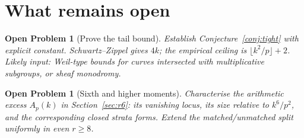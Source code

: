 \documentclass[11pt]{article}
\newtheorem{openproblem}[theorem]{Open Problem}
\begin{document}
\section{What remains open}\label{sec:open}

\begin{openproblem}[Prove the tail bound]\label{op:tail}
Establish Conjecture~\ref{conj:tight} with explicit constant.
Schwartz--Zippel gives $4k$; the empirical ceiling is
$\lfloor k^2/p\rfloor+2$. Likely input: Weil-type bounds for curves
intersected with multiplicative subgroups, or sheaf monodromy.
\end{openproblem}

\begin{openproblem}[Sixth and higher moments]\label{op:r6}
Characterise the arithmetic excess $A_p(k)$ in
Section~\ref{sec:r6}: its vanishing locus, its size relative to
$k^6/p^2$, and the corresponding closed strata forms. Extend the
matched/unmatched split uniformly in even $r\ge8$.
\end{openproblem}
\end{document}
